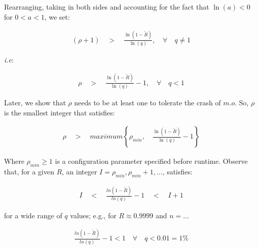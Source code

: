 \begin{description}
        Rearranging, taking in both sides and accounting for the fact that $\ln(a) < 0$ for  $0 < a < 1$, we set:
        
        \begin{equation}
            \begin{aligned}
                \left(\rho + 1\right) \quad > \quad \frac{\ln\left( 1 - \tilde{R} \right)}{\ln\left(q \right)}, \quad \forall \quad q \neq 1
            \end{aligned}
        \end{equation}

        \emph{i.e}:        
        
        \begin{equation} \label{eq:rho_ie}
            \begin{aligned}
                \rho \quad > \quad \frac{\ln\left(1 - \tilde{R}\right)}{\ln(q)} - 1, \quad \forall \quad q < 1
            \end{aligned}
        \end{equation}
        
        Later, we show that $\rho$ needs to be at least one to tolerate the crash of $m.o$.  So, $\rho$ is the smallest integer that satisfies:
        
        \begin{equation}
            \begin{aligned}
                \rho \quad > \quad maximum \left\{ \rho_{min}, \quad \frac{\ln\left(1 - \tilde{R}\right)}{\ln(q)} - 1 \right\}
            \end{aligned}
        \end{equation}
        
        Where $\rho_{min} \geq 1$ is a configuration parameter specified before runtime.  Observe that, for a given $R$, an integer $I =\rho_{min}, \rho_{min} + 1, \ldots$, satisfies: 

        \begin{equation*}
            \begin{aligned}
                I \quad < \quad  \frac{ln \left(1 - \tilde{R}\right)}{ln(q)} - 1 \quad < \quad I + 1
            \end{aligned}
        \end{equation*}
        
        for a wide range of $q$ values; e.g., for $R \approx 0.9999$ and $n = \ldots$

        \begin{equation*}
            \begin{aligned}
                \frac{ln(1- \tilde{R})}{ln(q)}-1 < 1 \quad \forall \quad q < 0.01 = 1\%
            \end{aligned}
        \end{equation*}


\end{description}
